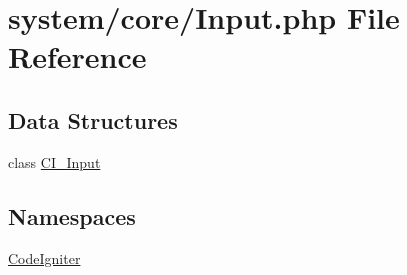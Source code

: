 \hypertarget{_input_8php}{\section{system/core/\-Input.php File Reference}
\label{_input_8php}
}
\subsection*{Data Structures}
\begin{DoxyCompactItemize}
\item 
class \hyperlink{class_c_i___input}{C\-I\-\_\-\-Input}
\end{DoxyCompactItemize}
\subsection*{Namespaces}
\begin{DoxyCompactItemize}
\item 
\hyperlink{namespace_code_igniter}{Code\-Igniter}
\end{DoxyCompactItemize}
